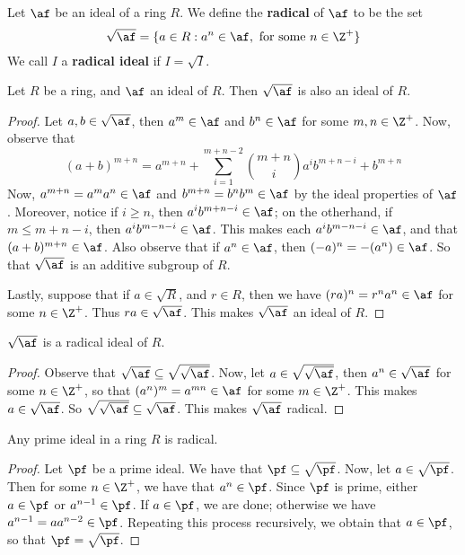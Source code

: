 \begin{definition}
    Let $\af$ be an ideal of a ring  $R$. We define the  \textbf{radical} of
    $\af$
    to be the set
    \begin{equation*}
        \sqrt{\af}=\{a \in R : a^n \in \af, \text{ for some } n \in \Z^+\}
    \end{equation*}
    We call $I$ a \textbf{radical ideal} if $I=\sqrt{I}$.
\end{definition}

\begin{proposition}\label{1.3.3}
    Let $R$ be a ring, and $\af$ an ideal of $R$. Then $\sqrt{\af}$ is also an
    ideal of $R$.
\end{proposition}
\begin{proof}
    Let $a,b \in \sqrt{\af}$, then $a^m \in \af$ and $b^n \in \af$ for some $m,n
    \in \Z^+$. Now, observe that
    \begin{equation*}
        (a+b)^{m+n}=a^{m+n}+\sum_{i=1}^{m+n-2}{{m+n \choose
        i}a^{i}b^{m+n-i}}+b^{m+n}
    \end{equation*}
    Now, $a^{m+n}=a^ma^n \in \af$ and $b^{m+n}=b^nb^m \in \af$ by the ideal
    properties of $\af$. Moreover, notice if $i \geq n$, then $a^ib^{m+n-i} \in
    \af$; on the otherhand, if $m \leq m+n-i$, then $a^ib^{m-n-i} \in \af$. This
    makes each $a^ib^{m-n-i} \in \af$, and that $(a+b)^{m+n} \in \af$. Also
    observe that if $a^n \in \af$, then $(-a)^n=-(a^n) \in \af$. So that
    $\sqrt{\af}$ is an additive subgroup of $R$.

    Lastly, suppose that if $a \in \sqrt{R}$, and $r \in R$, then we have
    $(ra)^n=r^na^n \in \af$ for some $n \in \Z^+$. Thus $ra \in \sqrt{\af}$. This
    makes $\sqrt{\af}$ an ideal of $R$.
\end{proof}
\begin{corollary}
    $\sqrt{\af}$ is a radical ideal of $R$.
\end{corollary}
\begin{proof}
    Observe that $\sqrt{\af} \subseteq \sqrt{\sqrt{\af}}$. Now, let $a \in
    \sqrt{\sqrt{\af}}$, then $a^n \in \sqrt{\af}$ for some $n \in \Z^+$, so that
    $(a^n)^m=a^{mn} \in \af$ for some $m \in \Z^+$. This makes $a \in
    \sqrt{\af}$. So $\sqrt{\sqrt{\af}} \subseteq \sqrt{\af}$. This makes
    $\sqrt{\af}$ radical.
\end{proof}

\begin{proposition}\label{1.3.4}
    Any prime ideal in a ring $R$ is radical.
\end{proposition}
\begin{proof}
    Let $\pf$ be a prime ideal. We have that $\pf \subseteq \sqrt{\pf}$. Now, let
    $a \in \sqrt{\pf}$. Then for some $n \in \Z^+$, we have that $a^n \in \pf$.
    Since $\pf$ is prime, either $a \in \pf$ or $a^{n-1} \in \pf$. If $a \in
    \pf$, we are done; otherwise we have $a^{n-1}=aa^{n-2} \in \pf$. Repeating
    this process recursively, we obtain that $a \in \pf$, so that
    $\pf=\sqrt{\pf}$.
\end{proof}

